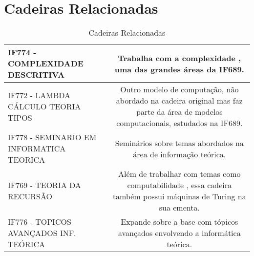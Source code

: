 \documentclass[a4paper]{article}
\begin{document}
\section{Cadeiras Relacionadas}



\begin{table}[h]
\centering
\caption{Cadeiras Relacionadas}
\label{my-label}
\begin{tabular}{l|c|}
\hline
IF774 - COMPLEXIDADE DESCRITIVA                                & Trabalha com a complexidade , uma das grandes áreas da IF689.                                                                     \\ \hline
\multicolumn{1}{|l|}{IF772 - LAMBDA CÁLCULO TEORIA TIPOS}      & Outro modelo de computação, não abordado na cadeira original mas faz parte da área de modelos computacionais, estudados na IF689. \\ \hline
\multicolumn{1}{|l|}{IF778 - SEMINARIO EM INFORMATICA TEORICA} & Seminários sobre temas abordados na área de informação teórica.                                                                   \\ \hline
\multicolumn{1}{|l|}{IF769 - TEORIA DA RECURSÃO}               & Além de trabalhar com temas como computabilidade , essa cadeira também possui máquinas de Turing na sua ementa.                   \\ \hline
IF776 - TOPICOS AVANÇADOS INF. TEÓRICA                         & Expande sobre a base com tópicos avançados envolvendo a informática teórica.                                                      \\ \hline

\end{tabular}
\end{table}

\cite{1}
\cite{2}
\cite{3}


\end{document}
